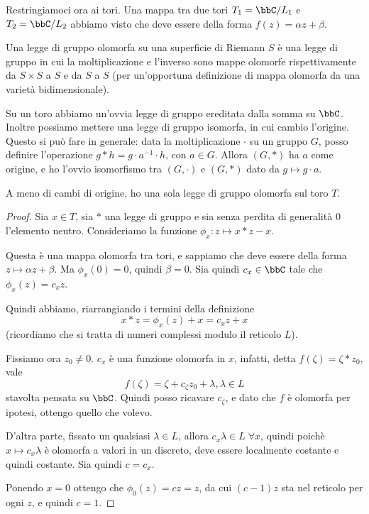 	Restringiamoci ora ai tori. Una mappa tra due tori $T_1 = \bbC/L_1$ e $T_2 = \bbC/L_2$ abbiamo visto che deve essere della forma $f(z)=\alpha z + \beta$.
	
	\begin{definizione}
		Una legge di gruppo olomorfa su una superficie di Riemann $S$ è una legge di gruppo in cui la moltiplicazione e l'inverso sono mappe olomorfe rispettivamente da $S \times S$ a $S$ e da $S$ a $S$ (per un'opportuna definizione di mappa olomorfa da una varietà bidimensionale).
	\end{definizione}
	
	Su un toro abbiamo un'ovvia legge di gruppo ereditata dalla somma su $\bbC$. Inoltre possiamo mettere una legge di gruppo isomorfa, in cui cambio l'origine. Questo si può fare in generale: data la moltiplicazione $\cdot$ su un gruppo $G$, posso definire l'operazione $g * h = g\cdot a^{-1}\cdot h$, con $a\in G$. Allora $(G,*)$ ha $a$ come origine, e ho l'ovvio isomorfismo tra $(G,\cdot)$ e $(G,*)$ dato da $g\mapsto g\cdot a$.
	
	\begin{proposizione}
		A meno di cambi di origine, ho una sola legge di gruppo olomorfa sul toro $T$.
	\end{proposizione}
	
	\begin{proof}
		Sia $x \in T$, sia $*$ una legge di gruppo e sia senza perdita di generalità $0$ l'elemento neutro. Consideriamo la funzione $\phi_x: z \mapsto x * z - x$.

		Questa è una mappa olomorfa tra tori, e sappiamo che deve essere della forma $z \mapsto \alpha z + \beta$. Ma $\phi_x(0)=0$, quindi $\beta=0$. Sia quindi $c_x \in \bbC$ tale che $\phi_x(z)=c_xz$.
		
		Quindi abbiamo, riarrangiando i termini della definizione 
		\[
		 x*z = \phi_x(z) + x = c_xz + x
		\]
		(ricordiamo che si tratta di numeri complessi modulo il reticolo $L$).
		
		Fissiamo ora $z_0\ne 0$. $c_x$ è una funzione olomorfa in $x$, infatti, detta $f(\zeta) = \zeta * z_0$, vale
		\[
			f(\zeta) = \zeta + c_\zeta z_0 + \lambda, \lambda \in L
		\]
		stavolta pensata su $\bbC$. Quindi posso ricavare $c_\zeta$, e dato che $f$ è olomorfa per ipotesi, ottengo quello che volevo.
		
		D'altra parte, fissato un qualsiasi $\lambda \in L$, allora $c_x\lambda \in L \; \forall x$, quindi poichè $x \mapsto c_x \lambda$ è olomorfa a valori in un discreto, deve essere localmente costante e quindi costante. Sia quindi $c=c_x$.
		
		Ponendo $x=0$ ottengo che $\phi_0(z) = cz = z$, da cui $(c-1)z$ sta nel reticolo per ogni $z$, e quindi $c=1$.


	\end{proof}


